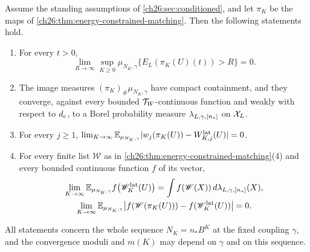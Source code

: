 \begin{theorem}\label{ch26:thm:orbit-limit}
Assume the standing assumptions of \cref{ch26:sec:conditioned}, and let $\pi_K$ be the maps of \cref{ch26:thm:energy-constrained-matching}. Then the following statements hold.
\begin{enumerate}
\item For every $t>0$,
\[
 \lim_{R\to\infty}\sup_{K\ge0}\mu_{N_K,\gamma}\bigl\{E_L(\pi_K(U)(t))>R\bigr\}=0 .
\]
\item The image measures $(\pi_K)_\#\mu_{N_K,\gamma}$ have compact containment, and they converge, against every bounded $\mathcal T_W$-continuous function and weakly with respect to $d_c$, to a Borel probability measure $\lambda_{L,\gamma,[n_*]}$ on $\mathcal X_L$.
\item For every $j\ge1$, $\lim_{K\to\infty}\mathbb E_{\mu_{N_K,\gamma}}\lvert w_j(\pi_K(U))-W^{\mathrm{lat}}_{K,j}(U)\rvert=0$.
\item For every finite list $\mathscr W$ as in \cref{ch26:thm:energy-constrained-matching}(4) and every bounded continuous function $f$ of its vector,
\[
 \begin{gathered}
 \lim_{K\to\infty}\mathbb E_{\mu_{N_K,\gamma}}f\bigl(\mathscr W^{\mathrm{lat}}_K(U)\bigr)=\int f(\mathscr W(X))\,d\lambda_{L,\gamma,[n_*]}(X),\\
 \lim_{K\to\infty}\mathbb E_{\mu_{N_K,\gamma}}\bigl\lvert f(\mathscr W(\pi_K(U)))-f(\mathscr W^{\mathrm{lat}}_K(U))\bigr\rvert=0 .
 \end{gathered}
\]
\end{enumerate}
\end{theorem}

All statements concern the whole sequence $N_K=n_*B^K$ at the fixed coupling $\gamma$, and the convergence moduli and $m(K)$ may depend on $\gamma$ and on this sequence.

